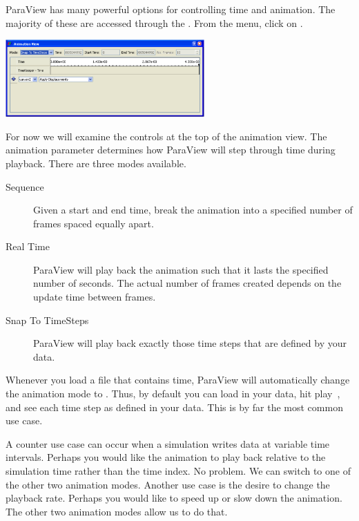 
ParaView has many powerful options for controlling time and animation.  The
majority of these are accessed through the .  From
the menu, click on  \ra {}.

\begin{inlinefig}
  \includegraphics[width=3in]{images/AnimationView}
\end{inlinefig}

For now we will examine the controls at the top of the animation view.  The
animation  parameter determines how ParaView will step
through time during playback.  There are three modes available.

\begin{description}
\item[Sequence] Given a start and end time, break the animation into a
  specified number of frames spaced equally apart.
\item[Real Time] ParaView will play back the animation such that it lasts
  the specified number of seconds.  The actual number of frames created
  depends on the update time between frames.
\item[Snap To TimeSteps] ParaView will play back exactly those time steps
  that are defined by your data.
\end{description}

Whenever you load a file that contains time, ParaView will automatically
change the animation mode to .  Thus, by default you
can load in your data, hit play~\vcrPlay, and see each time step as defined
in your data.  This is by far the most common use case.

A counter use case can occur when a simulation writes data at variable time
intervals.  Perhaps you would like the animation to play back relative to
the simulation time rather than the time index.  No problem.  We can switch
to one of the other two animation modes.  Another use case is the desire to
change the playback rate.  Perhaps you would like to speed up or slow down
the animation.  The other two animation modes allow us to do that.

